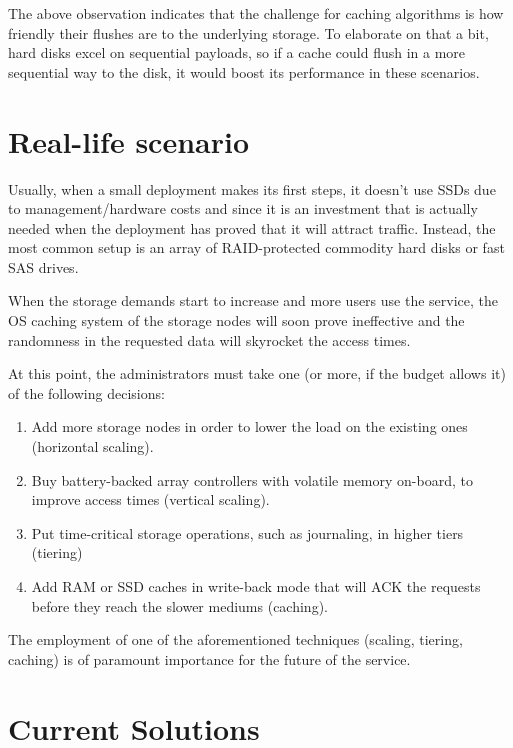 The above observation indicates that the challenge for caching algorithms is 
how friendly their flushes are to the underlying storage. To elaborate on that 
a bit, hard disks excel on sequential payloads, so if a cache could flush in a 
more sequential way to the disk, it would boost its performance in these 
scenarios.

\section{Real-life scenario}\label{sec:real-life-triad}

Usually, when a small deployment makes its first steps, it doesn't use SSDs due 
to management/hardware costs and since it is an investment that is actually 
needed when the deployment has proved that it will attract traffic. Instead, 
the most common setup is an array of RAID-protected commodity hard disks or 
fast SAS drives.

When the storage demands start to increase and more users use the service, the 
OS caching system of the storage nodes will soon prove ineffective and the 
randomness in the requested data will skyrocket the access times.

At this point, the administrators must take one (or more, if the budget allows 
it) of the following decisions:

\begin{enumerate}
	\item Add more storage nodes in order to lower the load on the existing 
		ones (horizontal scaling).
	\item Buy battery-backed array controllers with volatile memory on-board, 
		to improve access times (vertical scaling).
	\item Put time-critical storage operations, such as journaling, in higher 
		tiers (tiering)
	\item Add RAM or SSD caches in write-back mode that will ACK the requests 
		before they reach the slower mediums (caching).
\end{enumerate}

The employment of one of the aforementioned techniques (scaling, tiering, 
caching) is of paramount importance for the future of the service.

\section{Current Solutions}\label{sec:scalability-triad}

